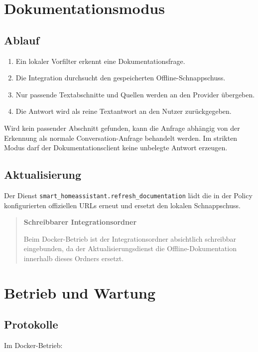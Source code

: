 \documentclass[
  11pt,
  a4paper,
  oneside,
  parskip=half
]{scrreprt}
\newcommand{\code}[1]{\texttt{#1}}
\newenvironment{smartwarning}[1]
{%
  \begin{quote}
    \color{SmartDark}
    \textbf{\textcolor{SmartAmber!80!black}{#1}}\par\smallskip
}
{%
  \end{quote}
}
\begin{document}
\chapter{Dokumentationsmodus}

\section{Ablauf}

\begin{enumerate}
  \item Ein lokaler Vorfilter erkennt eine Dokumentationsfrage.
  \item Die Integration durchsucht den gespeicherten Offline-Schnappschuss.
  \item Nur passende Textabschnitte und Quellen werden an den Provider übergeben.
  \item Die Antwort wird als reine Textantwort an den Nutzer zurückgegeben.
\end{enumerate}

Wird kein passender Abschnitt gefunden, kann die Anfrage abhängig von der Erkennung als
normale Conversation-Anfrage behandelt werden. Im strikten Modus darf der
Dokumentationsclient keine unbelegte Antwort erzeugen.

\section{Aktualisierung}

Der Dienst \code{smart\_homeassistant.refresh\_documentation} lädt die in der Policy
konfigurierten offiziellen URLs erneut und ersetzt den lokalen Schnappschuss.

\begin{smartwarning}{Schreibbarer Integrationsordner}
Beim Docker-Betrieb ist der Integrationsordner absichtlich schreibbar eingebunden, da der
Aktualisierungsdienst die Offline-Dokumentation innerhalb dieses Ordners ersetzt.
\end{smartwarning}

\chapter{Betrieb und Wartung}

\section{Protokolle}

Im Docker-Betrieb:
\end{document}
